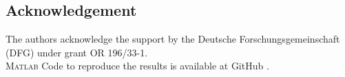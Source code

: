 \documentclass[fleqn,a4paper,10pt]{article}
\begin{document}
\begin{multicols}{2}

\section{Acknowledgement}

The authors acknowledge the support by the Deutsche Forschungsgemeinschaft (DFG) under grant OR 196/33-1.\\
\textsc{Matlab} Code to reproduce the results is available at GitHub \cite{GitHubThisPaper}.






\end{multicols}
\end{document}
